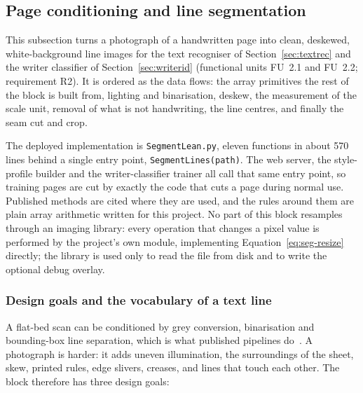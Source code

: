 \subsection{Page conditioning and line segmentation}
\label{sec:segmentation}

This subsection turns a photograph of a handwritten page into clean, deskewed, white-background line images for the text recogniser of Section~\ref{sec:textrec} and the writer classifier of Section~\ref{sec:writerid} (functional units FU~2.1 and FU~2.2; requirement R2). It is ordered as the data flows: the array primitives the rest of the block is built from, lighting and binarisation, deskew, the measurement of the scale unit, removal of what is not handwriting, the line centres, and finally the seam cut and crop.

The deployed implementation is \texttt{SegmentLean.py}, eleven functions in about 570 lines behind a single entry point, \texttt{SegmentLines(path)}. The web server, the style-profile builder and the writer-classifier trainer all call that same entry point, so training pages are cut by exactly the code that cuts a page during normal use. Published methods are cited where they are used, and the rules around them are plain array arithmetic written for this project. No part of this block resamples through an imaging library: every operation that changes a pixel value is performed by the project's own module, implementing Equation~\ref{eq:seg-resize} directly; the library is used only to read the file from disk and to write the optional debug overlay.

\subsubsection{Design goals and the vocabulary of a text line}

A flat-bed scan can be conditioned by grey conversion, binarisation and bounding-box line separation, which is what published pipelines do~\cite{hemanth2022,chen2023}. A photograph is harder: it adds uneven illumination, the surroundings of the sheet, skew, printed rules, edge slivers, creases, and lines that touch each other. The block therefore has three design goals:

